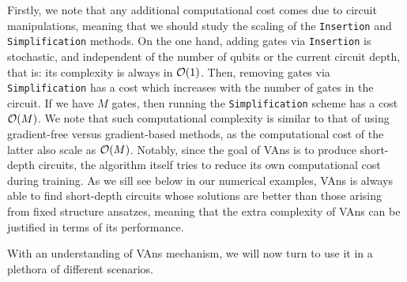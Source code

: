 Firstly, we note that any additional computational cost comes due to circuit manipulations, meaning that we should study the scaling of the \texttt{Insertion} and \texttt{Simplification} methods. On the one hand, adding gates via \texttt{Insertion} is stochastic, and independent of the number of qubits or the current circuit depth, that is:  its complexity is always in $\mathcal{O}(1)$. Then, removing gates via \texttt{Simplification} has a cost which increases with the number of gates in the circuit. If we have $M$ gates, then running the \texttt{Simplification} scheme has a cost $\mathcal{O}(M)$. We note that such computational complexity is similar to that of using gradient-free versus gradient-based methods, as the computational cost of the latter also scale as $\mathcal{O}(M)$. Notably, since the goal of VAns is to produce short-depth circuits, the algorithm itself tries to reduce its own computational cost during training.  As we sill see below in our numerical examples, VAns is always able to find short-depth circuits whose solutions are better than those arising from fixed structure ansatzes, meaning that the extra complexity of VAns can be justified in terms of its performance.

With an understanding of VAns mechanism, we will now turn to use it in a plethora of different scenarios.
